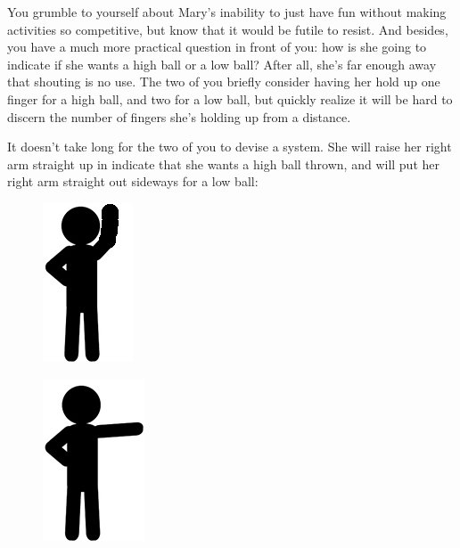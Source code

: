 \documentclass[UTF8]{book}
\begin{document}
\begin{CJK}{UTF8}{gbsn}
You grumble to yourself about Mary's inability to just have fun without making activities so competitive, but know that it would be futile to resist. And besides, you have a much more practical question in front of you: how is she going to indicate if she wants a high ball or a low ball? After all, she's far enough away that shouting is no use. The two of you briefly consider having her hold up one finger for a high ball, and two for a low ball, but quickly realize it will be hard to discern the number of fingers she's holding up from a distance.

It doesn't take long for the two of you to devise a system. She will raise her right arm straight up in indicate that she wants a high ball thrown, and will put her right arm straight out sideways for a low ball:

\begin{figure}[H]
\centering
\captionsetup{labelformat=empty}
\begin{minipage}{.4\textwidth}
  \centering
  \includegraphics[width=.3\linewidth]{stick-figure-arm-raised}
  \label{fig:test1}
\end{minipage}%
\begin{minipage}{.4\textwidth}
  \centering
  \includegraphics[width=.3\linewidth]{stick-figure-arm-sideways}
  \label{fig:test2}
\end{minipage}
\end{figure}


\end{CJK}
\end{document}
